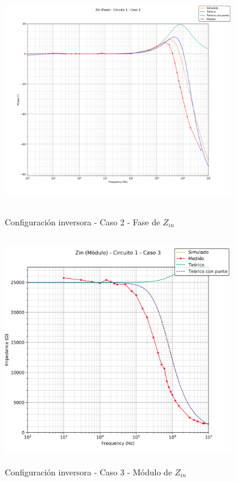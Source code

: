 \begin{figure}[H] %
	\centering
	\includegraphics[width=10cm,height=10cm,keepaspectratio]{../EJ1/00GRAFICOS/c1c2/c1c2zinFASE.png}
	\caption{Configuración inversora - Caso 2 - Fase de $Z_{in}$}
	\label{c1c2zinP}
\end{figure}

\begin{figure}[H] %
	\centering
	\includegraphics[width=10cm,height=10cm,keepaspectratio]{../EJ1/00GRAFICOS/c1c3/c1c3ZINpunta.png}
	\caption{Configuración inversora - Caso 3 - M\'odulo de $Z_{in}$}
	\label{c1c3zinM}
\end{figure}

